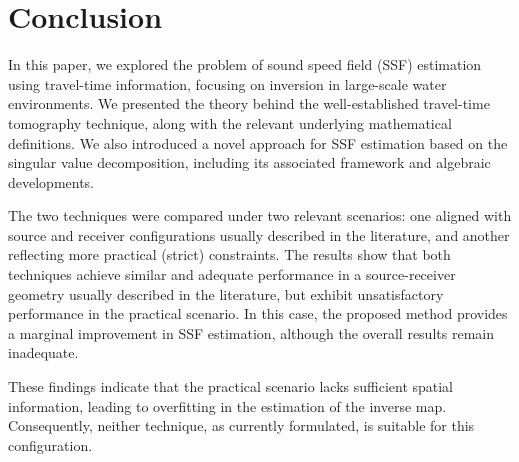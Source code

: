 \section{Conclusion}
\label{sec:conclusion}

In this paper, we explored the problem of sound speed field (SSF) estimation using travel-time information, focusing on inversion in large-scale water environments. We presented the theory behind the well-established travel-time tomography technique, along with the relevant underlying mathematical definitions. We also introduced a novel approach for SSF estimation based on the singular value decomposition, including its associated framework and algebraic developments.

The two techniques were compared under two relevant scenarios: one aligned with source and receiver configurations usually described in the literature, and another reflecting more practical (strict) constraints. The results show that both techniques achieve similar and adequate performance in a source-receiver geometry usually described in the literature, but exhibit unsatisfactory performance in the practical scenario. In this case, the proposed method provides a marginal improvement in SSF estimation, although the overall results remain inadequate.

These findings indicate that the practical scenario lacks sufficient spatial information, leading to overfitting in the estimation of the inverse map. Consequently, neither technique, as currently formulated, is suitable for this configuration.